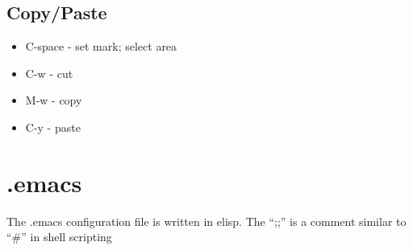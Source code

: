 \documentclass[11pt]{article}
\begin{document}
\subsection{Copy/Paste}
\label{sec-1-4}

\begin{itemize}
\item C-space - set mark; select area
\item C-w - cut
\item M-w - copy
\item C-y - paste
\end{itemize}
\section{.emacs}
\label{sec-2}



The .emacs configuration file is written in elisp. The ``;;'' is a comment similar to ``\#'' in shell scripting
\end{document}
